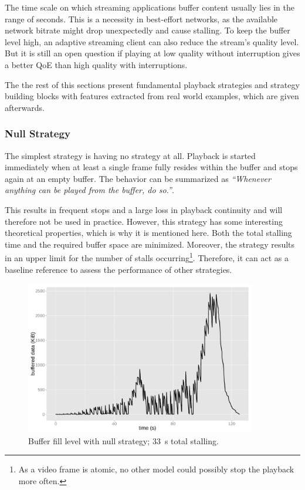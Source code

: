 The time scale on which streaming applications buffer content usually lies in the range of seconds. This is a necessity in best-effort networks, as the available network bitrate might drop unexpectedly and cause stalling. To keep the buffer level high, an adaptive streaming client can also reduce the stream's quality level. But it is still an open question if playing at low quality without interruption gives a better \gls{QoE} than high quality with interruptions.

The the rest of this sections present fundamental playback strategies and strategy building blocks with features extracted from real world examples, which are given afterwards. 



\subsubsection{Null Strategy}

The simplest strategy is having no strategy at all. Playback is started immediately when at least a single frame fully resides within the buffer and stops again at an empty buffer. The behavior can be summarized as \textit{``Whenever anything can be played from the buffer, do so.''}.

This results in frequent stops and a large loss in playback continuity and will therefore not be used in practice. However, this strategy has some interesting theoretical properties, which is why it is mentioned here. Both the total stalling time and the required buffer space are minimized. Moreover, the strategy results in an upper limit for the number of stalls occurring\footnote{As a video frame is atomic, no other model could possibly stop the playback more often.}. Therefore, it can act as a baseline reference to assess the performance of other strategies.

\begin{figure}[htb]
	\centering
	\includegraphics[width=0.9\textwidth]{images/R-bufferlevel-stall.pdf}
	\caption{Buffer fill level with null strategy; \SI{33}{\second} total stalling.}
\label{c3:fig:bufferlevel-stall}
\end{figure}

